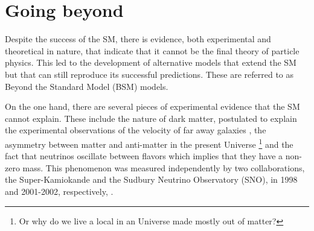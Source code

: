
\section{Going beyond}
\label{section:BSM}
%
%

Despite the success of the SM, there is evidence, both experimental and theoretical in nature, that indicate that it cannot be the final theory of particle physics. This led to the development of alternative models that extend the SM but that can still reproduce its successful predictions. These are referred to as Beyond the Standard Model (BSM) models. 

On the one hand, there are several pieces of experimental evidence that the SM cannot explain. These include the nature of dark matter, postulated to explain the experimental observations of the velocity of far away galaxies \cite{DM}, the asymmetry between matter and anti-matter in the present Universe \footnote{Or why do we live a local in an Universe made mostly out of matter?} and the fact that neutrinos oscillate between flavors which implies that they have a non-zero mass. This phenomenon was measured independently by two collaborations, the Super-Kamiokande and the Sudbury Neutrino Observatory (SNO), in 1998 and 2001-2002, respectively, \cite{neutrinosSuperK,neutrinosSNO1,neutrinosSNO2}.

